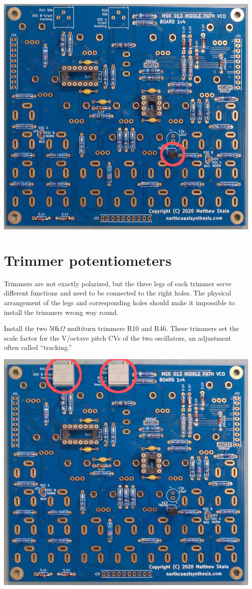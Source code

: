 \nopagebreak
\noindent\includegraphics[width=\linewidth]{78l09.jpg}

\pagebreak

\section{Trimmer potentiometers}

Trimmers are not exactly polarized, but the three legs of each trimmer serve
different functions and need to be connected to the right holes.  The
physical arrangement of the legs and corresponding holes should make it
impossible to install the trimmers wrong way round.

Install the two 50k$\Omega$ multiturn trimmers R10 and R46.  These trimmers
set the scale factor for the V/octave pitch CVs of the two oscillators, an
adjustment often called ``tracking.''

\nopagebreak
\noindent\includegraphics[width=\linewidth]{trim-50k.jpg}

